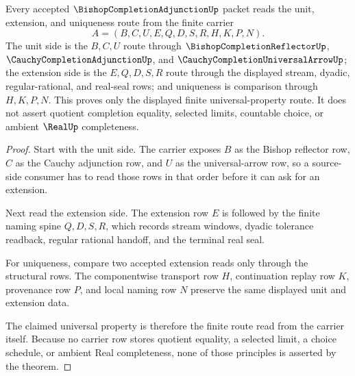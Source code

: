 \begin{theorem}
\label{thm:bishop-completion-adjunction-universal-property}
Every accepted $\BishopCompletionAdjunctionUp$ packet reads the unit, extension, and uniqueness route from the finite carrier
$$
A=(B,C,U,E,Q,D,S,R,H,K,P,N).
$$
The unit side is the $B,C,U$ route through $\BishopCompletionReflectorUp$, $\CauchyCompletionAdjunctionUp$, and $\CauchyCompletionUniversalArrowUp$; the extension side is the $E,Q,D,S,R$ route through the displayed stream, dyadic, regular-rational, and real-seal rows; and uniqueness is comparison through $H,K,P,N$. This proves only the displayed finite universal-property route. It does not assert quotient completion equality, selected limits, countable choice, or ambient $\RealUp$ completeness.
\end{theorem}
\begin{proof}
Start with the unit side. The carrier exposes $B$ as the Bishop reflector row, $C$ as the Cauchy adjunction row, and $U$ as the universal-arrow row, so a source-side consumer has to read those rows in that order before it can ask for an extension.

Next read the extension side. The extension row $E$ is followed by the finite naming spine $Q,D,S,R$, which records stream windows, dyadic tolerance readback, regular rational handoff, and the terminal real seal.

For uniqueness, compare two accepted extension reads only through the structural rows. The componentwise transport row $H$, continuation replay row $K$, provenance row $P$, and local naming row $N$ preserve the same displayed unit and extension data.

The claimed universal property is therefore the finite route read from the carrier itself. Because no carrier row stores quotient equality, a selected limit, a choice schedule, or ambient Real completeness, none of those principles is asserted by the theorem.
\end{proof}


